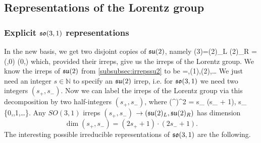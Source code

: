 \subsection{Representations of the Lorentz group}
\label{subsec:lorentzrep}
\subsubsection{Explicit $\mathfrak{so}(3,1)$ representations}
In the new basis, we get two disjoint copies of $\mathfrak{su}(2)$, namely 
\be
\msu(3)=\msu(2)_L \times \msu(2)_R = (\half,0) \oplus (0,\half)
\ee 
 which, provided their irreps, give us the irreps of the Lorentz group. We know the irreps of $\mathfrak{su}(2)$ from \ref{subsubsec:irrepssu2} to be
 \bse 
 \cdot=\mI,\quad \yng(1),\quad \yng(2),\dots
  \ese 
  We just need an integer $s\in \mathbb{N}$ to specify an $\mathfrak{su}(2)$ irrep, i.e. for $\mathfrak{so}(3,1)$ we need two integers $(s_+,s_-)$.
   Now we can label the irreps of the Lorentz group via this decomposition by two half-integers $(s_+,s_-)$, where
  \be 
  (^\pm)^2 = s_{\pm} (s_{\pm} + 1), \quad s_{\pm} \in \left\{0,,1,\dots  \right\}.
  \ee 
Any $SO(3,1)$ irreps $(s_+,s_-)$ $\rightarrow(\mathfrak{su}(2)_L,\mathfrak{su}(2)_R)$ has dimension
\begin{equation*}
	\dim(s_+,s_-) = (2s_++1)\cdot (2s_-+1).
\end{equation*}
The interesting possible irreducible representations of $\mathfrak{so}(3,1)$ are the following.
